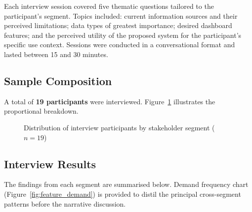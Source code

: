\documentclass[12pt,a4paper]{report}
\begin{document}
Each interview session covered five thematic questions tailored to the participant's segment.
Topics included: current information sources and their perceived limitations; data types of
greatest importance; desired dashboard features; and the perceived utility of the proposed
system for the participant's specific use context. Sessions were conducted in a conversational
format and lasted between 15 and 30 minutes.

\subsection{Sample Composition}

A total of \textbf{19 participants} were interviewed. Figure~\ref{fig:participant_distribution} illustrates the proportional breakdown.

\begin{figure}[H]
  \centering
  \caption{\centering Distribution of interview participants by stakeholder segment ($n = 19$)}
  \label{fig:participant_distribution}
\end{figure}

\subsection{Interview Results}

The findings from each segment are summarised below. Demand frequency chart
(Figure~\ref{fig:feature_demand}) is provided to distil the principal cross-segment
patterns before the narrative discussion.
\end{document}
